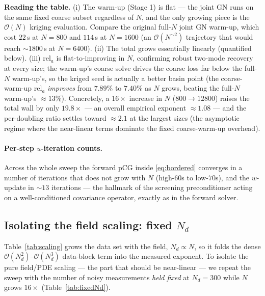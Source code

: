 \documentclass[11pt]{article}
\newcommand{\bigO}{\mathcal{O}}
\begin{document}
\noindent\textbf{Reading the table.} (i) The warm-up (Stage 1) is flat ---
the joint GN runs on the same fixed coarse subset regardless of $N$, and the
only growing piece is the $\bigO(N)$ kriging evaluation. Compare the original
full-$N$ joint GN warm-up, which cost $22$\,s at $N=800$ and $114$\,s at
$N=1600$ (an $\bigO(N^{\sim 2})$ trajectory that would reach $\sim\!1800$\,s at
$N=6400$). (ii) The total grows essentially linearly (quantified below).
(iii) $\mathrm{rel}_a$ is flat-to-improving
in $N$, confirming robust two-mode recovery at every size; the warm-up's coarse
solve drives the coarse loss far below the full-$N$ warm-up's, so the kriged
seed is actually a better basin point (the coarse-warm-up $\mathrm{rel}_a$
\emph{improves} from $7.89\%$ to $7.40\%$ as $N$ grows, beating the full-$N$
warm-up's $\approx 13\%$). Concretely, a $16\times$ increase in $N$ ($800\to
12800$) raises the total wall by only $19.8\times$ --- an overall empirical
exponent $\approx 1.08$ --- and the per-doubling ratio settles toward $\approx
2.1$ at the largest sizes (the asymptotic regime where the near-linear terms
dominate the fixed coarse-warm-up overhead).

\paragraph{Per-step $u$-iteration counts.} Across the whole sweep the forward
pCG inside \eqref{eq:bordered} converges in a number of iterations that does not
grow with $N$ (high-$60$s to low-$70$s), and the $w$-update in $\sim\!13$
iterations --- the hallmark of the screening preconditioner acting on a
well-conditioned covariance operator, exactly as in the forward solver.

\subsection{Isolating the field scaling: fixed $N_d$}\label{sec:fixedNd}

Table~\ref{tab:scaling} grows the data set with the field, $N_d\propto N$, so it
folds the dense $\bigO(N_d^2)$--$\bigO(N_d^3)$ data-block term into the measured
exponent. To isolate the pure field/PDE scaling --- the part that should be
near-linear --- we repeat the sweep with the number of noisy measurements
\emph{held fixed} at $N_d=300$ while $N$ grows $16\times$ (Table~\ref{tab:fixedNd}).
\end{document}
